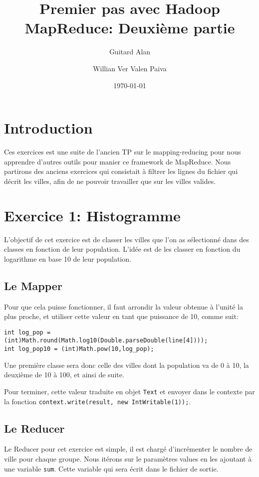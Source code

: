 \documentclass[a4paper]{article}
\author{Guitard Alan \and Willian Ver Valen Paiva }
\date{\today}
\title{Premier pas avec Hadoop MapReduce: Deuxième partie}
\begin{document}
\maketitle

\tableofcontents

\newpage

\section{Introduction}
	
	Ces exercices est une suite de l'ancien TP sur le mapping-reducing pour nous apprendre d'autres outils pour manier ce framework de MapReduce.
	Nous partirons des anciens exercices qui consistait à filtrer les lignes du fichier qui décrit les villes, afin de ne pouvoir travailler que sur les villes valides.

\section{Exercice 1: Histogramme}

L'objectif de cet exercice est de classer les villes que l'on as sélectionné dans des classes en fonction de leur population. L'idée est de les classer en fonction du logarithme en base 10 de leur population.\linebreak

\subsection{Le Mapper}
Pour que cela puisse fonctionner, il faut arrondir la valeur obtenue à l'unité la plus proche, et utiliser cette valeur en tant que puissance de 10, comme suit:
\begin{lstlisting}
int log_pop = (int)Math.round(Math.log10(Double.parseDouble(line[4])));
int log_pop10 = (int)Math.pow(10,log_pop);
\end{lstlisting}

Une première classe sera donc celle des villes dont la population va de 0 à 10, la deuxième de 10 à 100, et ainsi de suite. 

Pour terminer, cette valeur traduite en objet \verb?Text? et envoyer dans le contexte par la fonction \verb?context.write(result, new IntWritable(1));?.

\subsection{Le Reducer}
Le Reducer pour cet exercice est simple, il est chargé d'incrémenter le nombre de ville pour chaque groupe.
Nous itérons sur le paramètres values en les ajoutant à une variable \verb?sum?. Cette variable qui sera écrit dans le fichier de sortie.
\end{document}
